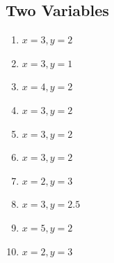 \documentclass{article}
\theoremstyle{mytheoremstyle}
\theoremstyle{mytheoremstyle}
\theoremstyle{myproblemstyle}
\begin{document}
        \subsection{Two Variables}
        \begin{enumerate}
            \item $x = 3, y = 2$
            \item $x = 3, y = 1$
            \item $x = 4, y = 2$
            \item $x = 3, y = 2$
            \item $x = 3, y = 2$
            \item $x = 3, y = 2$
            \item $x = 2, y = 3$
            \item $x = 3, y = 2.5$
            \item $x = 5, y = 2$
            \item $x = 2, y = 3$
        \end{enumerate}
\end{document}
